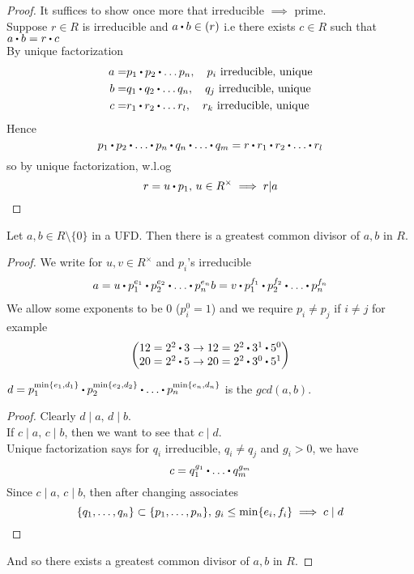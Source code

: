 \documentclass[../Main.tex]{subfiles}
\begin{document}
\begin{proof}
	It suffices to show once more that irreducible $\implies$ prime.\\
	Suppose $r\in R$ is irreducible and $a\rdot b\in (r)$ i.e there exists $c\in R$ such that $a\rdot b=r\rdot c$\\
	By unique factorization
	\begin{align*}
	a=&p_1\rdot p_2\rdot \dots p_n,\quad p_i \text{ irreducible, unique}\\
	b=&q_1\rdot q_2\rdot \dots q_n,\quad q_j \text{ irreducible, unique}\\
	c=&r_1\rdot r_2\rdot \dots r_l,\quad r_k \text{ irreducible, unique}
	\end{align*}
	Hence
	\[p_1\rdot p_2\rdot \dots \rdot p_n \rdot q_n \rdot \dots \rdot q_m = r \rdot r_1 \rdot r_2\rdot  \dots \rdot r_l\]
	so by unique factorization, w.l.og
	\[r=u\rdot p_1,\, u\in R^\times \implies r|a\qedhere\]
\end{proof}
\begin{prop}[title=Nonzero elements in UFD have GCD]
	Let $a,b\in R\setminus \{0\}$ in a UFD. Then there is a greatest common divisor of $a,b$ in $R$.
\end{prop}
\begin{proof}
	We write for $u,v\in R^\times$ and $p_i$'s irreducible
	\begin{align*}
	a=u\rdot p_1^{e_1}\rdot p_2^{e_2}\rdot \dots \rdot p_n^{e_n}
	b=v\rdot p_1^{f_1}\rdot p_2^{f_2}\rdot \dots \rdot p_n^{f_n}
	\end{align*}
	We allow some exponents to be $0$ ($p_i^0=1$) and we require $p_i\ne p_j$ if $i\ne j$ for example
	\[\begin{pmatrix}
	12=2^2\rdot 3 \to 12= 2^2\rdot 3^1\rdot 5^0 \\
	20=2^2\rdot 5 \to 20 =2^2\rdot 3^0\rdot 5^1 
	\end{pmatrix}\]
	\begin{claim}
		$d=p_1^{\min\{e_1,d_1\}}\rdot p_2^{\min\{e_2,d_2\}}\rdot \dots \rdot p_n^{\min\{e_n,d_n\}}$
		is the $gcd(a,b)$.
	\end{claim}
	\begin{proof}
		Clearly $d\mid a,\, d\mid b$.\\
		If $c\mid a, \, c\mid b$, then we want to see that $c\mid d$.\\
		Unique factorization says for $q_i$ irreducible, $q_i\ne q_j$ and $g_i>0$, we have
		\[c=q_1^{g_1}\rdot \dots \rdot q_m^{g_m}\]
		Since $c\mid a,\, c\mid b$, then after changing associates
		\[\{q_1,\dots,q_n\}\subset \{p_1,\dots,p_n\}, \, g_i\le \min\{e_i,f_i\}\implies c\mid d\qedhere\]
	\end{proof}
	And so there exists a greatest common divisor of $a,b$ in $R$.
\end{proof}
\end{document}
